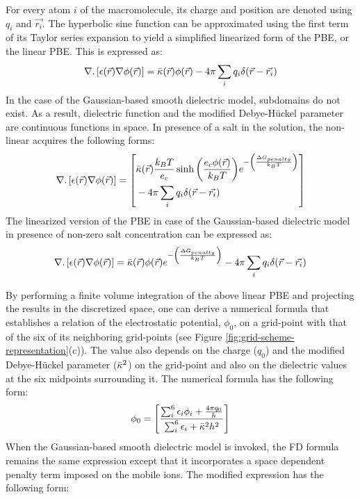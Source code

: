 \documentclass[9pt,tutorial]{livecoms}
\begin{document}
For every atom $ i $ of the macromolecule, its charge and position are denoted using $ q_i $ and $ \Vec{r_i}$. The hyperbolic sine function can be approximated using the first term of its Taylor series expansion to yield a simplified linearized form of the PBE, or the linear PBE. This is expressed as:
\begin{equation}
\nabla . \left[ \epsilon(\Vec{r})\nabla\phi(\Vec{r})\right] = \Bar{\kappa}(\Vec{r})\phi(\Vec{r}) - 4\pi\sum_{i} {q_i \delta(\Vec{r} - \Vec{r_i})}
\end{equation}
In the case of the Gaussian-based smooth dielectric model, subdomains do not exist. As a result,  dielectric function and the modified Debye-Hückel parameter are continuous functions in space. In presence of a salt in the solution, the non-linear acquires the following forms:
\begin{equation}
\nabla.\left[\epsilon(\Vec{r})\nabla\phi(\Vec{r})\right] = \left[
    \begin{aligned}
    & \Bar{\kappa}(\Vec{r})\frac{k_BT}{e_c}\sinh{\left(\frac{e_c\phi(\Vec{r})}{k_BT}\right)}e^{-\left(\frac{\Delta G_{penalty}}{k_BT} \right)} \\
    &- 4\pi\sum_{i} {q_i \delta(\Vec{r} - \Vec{r_i})}
\end{aligned}
\right]
\end{equation}
The linearized version of the PBE in case of the Gaussian-based dielectric model in presence of non-zero salt concentration can be expressed as:
\begin{equation}
\nabla . \left[ \epsilon(\Vec{r})\nabla\phi(\Vec{r})\right] = \Bar{\kappa}(\Vec{r})\phi(\Vec{r})e^{-\left(\frac{\Delta G_{penalty}}{k_BT} \right)} - 4\pi\sum_{i} {q_i \delta(\Vec{r} - \Vec{r_i})}
\end{equation}

By performing a finite volume integration of the above linear PBE and projecting the results in the discretized space, one can derive a numerical formula that establishes a relation of the electrostatic potential, $ \phi_0 $, on a grid-point with that of the six of its neighboring grid-points (see Figure \ref{fig:grid-scheme-representation}(c)). The value also depends on the charge ($ q_0 $) and the modified Debye-Hückel parameter ($ \Bar{\kappa}^2 $) on the grid-point and also on the dielectric values at the six midpoints surrounding it. The numerical formula has the following form:
\begin{equation}
    \phi_0 = 
    \left[ 
        \frac{\sum_i^6{\epsilon_i\phi_i } + 
                \frac{4\pi q_0}{h}
             }
             {\sum_i^6{\epsilon_i} + \Bar{\kappa}^2h^2}
    \right]
\end{equation}
When the Gaussian-based smooth dielectric model is invoked, the FD formula remains the same expression except that it incorporates a space dependent penalty term imposed on the mobile ions. The modified expression has the following form:
\end{document}
